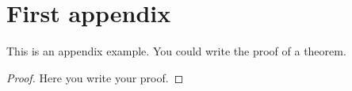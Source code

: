 %
%
%


\chapter{First appendix}

This is an appendix example. You could write the proof of a theorem.
\begin{proof}
    Here you write your proof.
\end{proof}